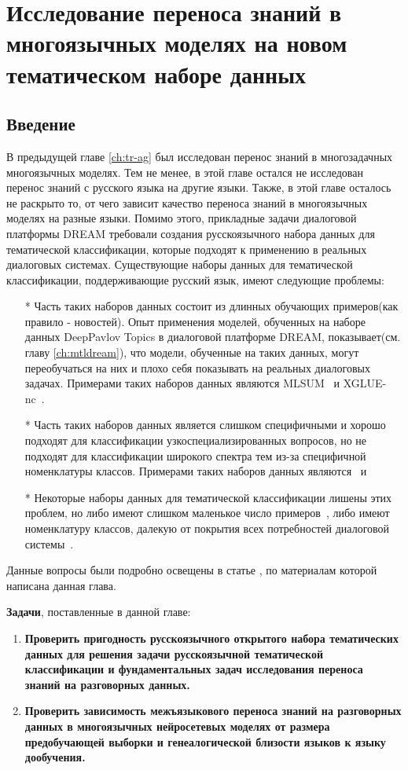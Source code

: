 \chapter{Исследование переноса знаний в многоязычных моделях на новом тематическом наборе данных}\label{ch:rutopics}
\section{Введение}
В предыдущей главе \ref{ch:tr-ag} был исследован перенос знаний в многозадачных многоязычных моделях. Тем не менее, в этой главе остался не исследован перенос знаний с русского языка на другие языки. Также, в этой главе осталось не раскрыто то, от чего зависит качество переноса знаний в многоязычных моделях на разные языки.
Помимо этого, прикладные задачи диалоговой платформы {DREAM} требовали создания русскоязычного набора данных для тематической классификации, которые подходят к применению в реальных диалоговых системах. Существующие наборы данных для тематической классификации, поддерживающие русский язык, имеют следующие проблемы:
\begin{itemize}
   \item[*] Часть таких наборов данных состоит из длинных обучающих примеров(как правило - новостей). Опыт применения моделей, обученных на наборе данных {DeepPavlov Topics} в диалоговой платформе DREAM, показывает(см. главу \ref{ch:mtldream}), что модели, обученные на таких данных, могут переобучаться на них и плохо себя показывать на реальных диалоговых задачах. Примерами таких наборов данных являются {MLSUM}~\cite{mlsum} и {XGLUE-nc}~\cite{xglue}.
   \item[*] Часть таких наборов данных является слишком специфичными и хорошо подходят для классификации узкоспециализированных вопросов, но не подходят для классификации широкого спектра тем из-за специфичной номенклатуры классов.  Примерами таких наборов данных являются~\cite{healthcare_facilities_reviews} и  ~\cite{pstu}
   \item[*] Некоторые наборы данных для тематической классификации лишены этих проблем, но либо имеют слишком маленькое число примеров~\cite{chatbotru}, либо имеют номенклатуру классов, далекую от покрытия всех потребностей диалоговой системы~\cite{massive}.
\end{itemize}
Данные вопросы были подробно освещены в статье \cite{rutopics}, по материалам которой написана данная глава. 

\textbf{Задачи}, поставленные в данной главе:
\begin{enumerate}
  \item \textbf{Проверить пригодность русскоязычного открытого набора тематических данных для решения задачи русскоязычной тематической классификации и фундаментальных задач исследования переноса знаний на разговорных данных.}
  \item \textbf{Проверить зависимость межъязыкового переноса знаний на разговорных данных в многоязычных нейросетевых моделях от размера предобучающей выборки и генеалогической близости языков к языку дообучения.}
  \end{enumerate}


